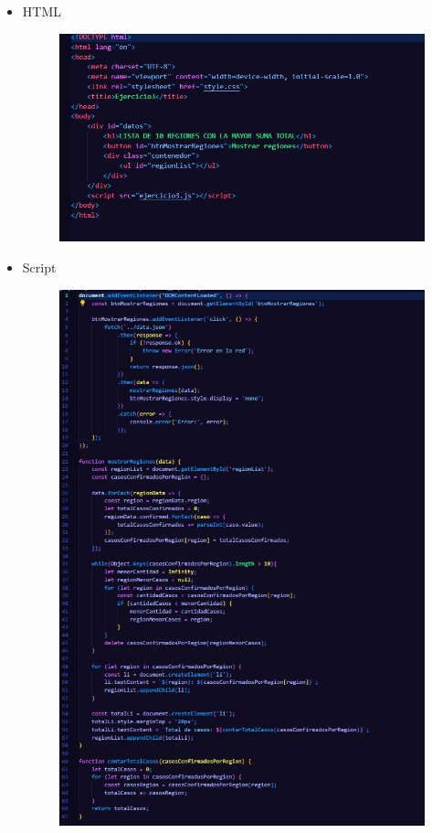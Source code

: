 \documentclass{article}
\begin{document}
	\begin{itemize}
		\item HTML
		\begin{figure}[H]
			\centering
			\includegraphics[width=1.0\textwidth,keepaspectratio]{img/Ejer3T2HTML.jpg}
		\end{figure}
		\item Script
		\begin{figure}[H]
			\centering
			\includegraphics[width=1.0\textwidth,keepaspectratio]{img/Ejer3T2Script.jpg}

\end{figure}
\end{itemize}
\end{document}
